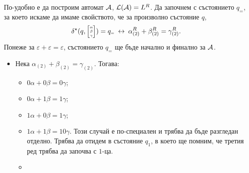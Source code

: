 \begin{hint}
  По-удобно е да построим автомат $\A$, $\L(\A) = L^R$.
  Да започнем с състоянието $q_{\scriptscriptstyle{=}}$, за което искаме да имаме свойството, че за произволно състояние $q$,
  \[\delta^\star(q, \tiny{ \begin{bmatrix} \alpha\\ \beta \\ \gamma\end{bmatrix} }) = q_{\scriptscriptstyle{=}}  \iff \alpha^R_{(2)} + \beta^R_{(2)} = \gamma^R_{(2)}.\]
  Понеже за $\varepsilon + \varepsilon = \varepsilon$, състоянието $q_{\scriptscriptstyle{=}}$ ще бъде начално и финално за $\A$.
  \begin{itemize}
  \item 
    Нека $\alpha_{(2)}+\beta_{(2)} = \gamma_{(2)}$. Тогава:
    \begin{itemize}
    \item 
      $0\alpha + 0\beta = 0\gamma$;
    \item
      $0\alpha + 1\beta = 1\gamma$;
    \item
      $1\alpha + 0\beta = 1\gamma$;
    \item
      $1\alpha + 1\beta = 10\gamma$. Този случай е по-специален и трябва да бъде разгледан отделно.
      Трябва да отидем в състояние $q_1$, в което ще помним, че третия ред трябва да започва с $1$-ца.
    \item

\end{itemize}
\end{itemize}
\end{hint}
